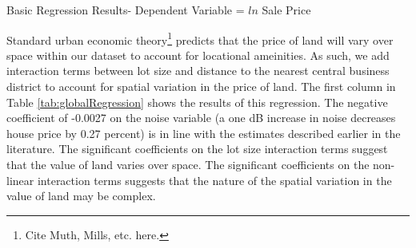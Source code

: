 \documentclass{article}\usepackage{graphicx, color}
\begin{document}
\begin{table}
\caption{Basic Regression Results- Dependent Variable = $ln$ Sale Price}\label{tab:globalRegression}

\end{table}


Standard urban economic theory\footnote{Cite Muth, Mills, etc. here.} predicts that the price of land will vary over space within our dataset to account for locational ameinities. As such, we add interaction terms between lot size and distance to the nearest central business district to account for spatial variation in the price of land. The first column in Table \ref{tab:globalRegression} shows the results of this regression. The negative coefficient of -0.0027 on the noise variable (a one dB increase in noise decreases house price by 0.27 percent) is in line with the estimates described earlier in the literature. The significant coefficients on the lot size interaction terms suggest that the value of land varies over space. The significant coefficients on the non-linear interaction terms suggests that the nature of the spatial variation in the value of land may be complex.
\end{document}
